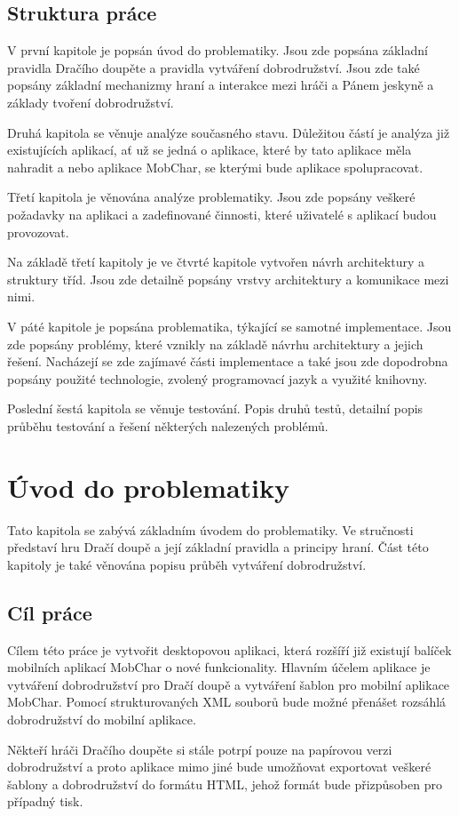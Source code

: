 \documentclass[thesis=B,czech]{resources/FITthesis}[2012/06/26]
\begin{document}
\begin{introduction}
\section*{Struktura práce}
V první kapitole je popsán úvod do problematiky. Jsou zde popsána základní pravidla Dračího doupěte a pravidla vytváření dobrodružství. Jsou zde také popsány základní mechanizmy hraní a interakce mezi hráči a Pánem jeskyně a základy tvoření dobrodružství. \par

Druhá kapitola se věnuje analýze současného stavu. Důležitou částí je analýza již existujících aplikací, ať už se jedná o aplikace, které by tato aplikace měla nahradit a nebo aplikace MobChar, se kterými bude aplikace spolupracovat. \par

Třetí kapitola je věnována analýze problematiky. Jsou zde popsány veškeré požadavky na aplikaci a zadefinované činnosti, které uživatelé s aplikací budou provozovat. \par

Na základě třetí kapitoly je ve čtvrté kapitole vytvořen návrh architektury a struktury tříd. Jsou zde detailně popsány vrstvy architektury a komunikace mezi nimi. \par

V páté kapitole je popsána problematika, týkající se samotné implementace. Jsou zde popsány problémy, které vznikly na základě návrhu architektury a jejich řešení. Nacházejí se zde zajímavé části implementace a také jsou zde dopodrobna popsány použité technologie, zvolený programovací jazyk a využité knihovny. \par

Poslední šestá kapitola se věnuje testování. Popis druhů testů, detailní popis průběhu testování a řešení některých nalezených problémů.


\end{introduction}

\chapter{Úvod do problematiky}
Tato kapitola se zabývá základním úvodem do problematiky. Ve stručnosti představí hru Dračí doupě a její základní pravidla a principy hraní. Část této kapitoly je také věnována popisu průběh vytváření dobrodružství.
	\section{Cíl práce}
Cílem této práce je vytvořit desktopovou aplikaci, která rozšíří již existují balíček mobilních aplikací MobChar o nové funkcionality. Hlavním účelem aplikace je vytváření dobrodružství pro Dračí doupě a vytváření šablon pro mobilní aplikace MobChar. Pomocí strukturovaných XML souborů bude možné přenášet rozsáhlá dobrodružství do mobilní aplikace. \par
Někteří hráči Dračího doupěte si stále potrpí pouze na papírovou verzi dobrodružství a proto aplikace mimo jiné bude umožňovat exportovat veškeré šablony a dobrodružství do formátu HTML, jehož formát bude přizpůsoben pro případný tisk. 
\end{document}
